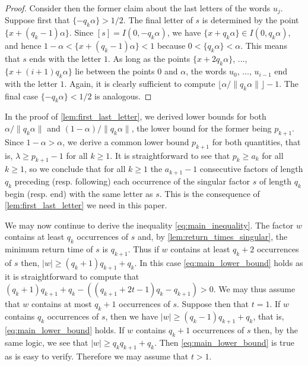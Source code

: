 \documentclass[a4paper,fleqn]{article}
\providecommand{\abs}[1]{\lvert#1\rvert}
\providecommand{\norm}[1]{\lVert#1\rVert}
\providecommand{\floor}[1]{\lfloor#1\rfloor}
\begin{document}
\begin{proof}
    Consider then the former claim about the last letters of the words $u_j$. Suppose first that
    $\{-q_k\alpha\} > 1/2$. The final letter of $s$ is determined by the point $\{x + (q_k - 1)\alpha\}$. Since
    $[s] = I(0, -q_k\alpha)$, we have $\{x + q_k\alpha\} \in I(0, q_k\alpha)$, and hence
    $1 - \alpha < \{x + (q_k - 1)\alpha\} < 1$ because $0 < \{q_k\alpha\} < \alpha$. This means that $s$ ends with the
    letter $1$. As long as the points $\{x + 2q_k\alpha\}$, $\ldots$, $\{x + (i + 1)q_k\alpha\}$ lie between the points
    $0$ and $\alpha$, the words $u_0$, $\ldots$, $u_{i-1}$ end with the letter $1$. Again, it is clearly sufficient to
    compute $\floor{\alpha/\norm{q_k\alpha}} - 1$. The final case $\{-q_k\alpha\} < 1/2$ is analogous.
  \end{proof}

  \begin{remark}\label{rem:weak_consequence}
    In the proof of \autoref{lem:first_last_letter}, we derived lower bounds for both $\alpha/\norm{q_k\alpha}$ and
    $(1 - \alpha)/\norm{q_k\alpha}$, the lower bound for the former being $p_{k+1}$. Since $1 - \alpha > \alpha$, we
    derive a common lower bound $p_{k+1}$ for both quantities, that is, $\lambda \geq p_{k+1} - 1$ for all $k \geq 1$.
    It is straightforward to see that $p_k \geq a_k$ for all $k \geq 1$, so we conclude that for all $k \geq 1$ the
    $a_{k+1} - 1$ consecutive factors of length $q_k$ preceding (resp. following) each occurrence of the singular factor
    $s$ of length $q_k$ begin (resp. end) with the same letter as $s$. This is the consequence of
    \autoref{lem:first_last_letter} we need in this paper.
  \end{remark}

  We may now continue to derive the inequality \eqref{eq:main_inequality}. The factor $w$ contains at least $q_k$
  occurrences of $s$ and, by \autoref{lem:return_times_singular}, the minimum return time of $s$ is $q_{k+1}$. Thus if
  $w$ contains at least $q_k + 2$ occurrences of $s$ then, $\abs{w} \geq (q_k + 1)q_{k+1} + q_k$. In this case
  \eqref{eq:main_lower_bound} holds as it is straightforward to compute that
  $(q_k + 1)q_{k+1} + q_k - ((q_{k+1} + 2t - 1)q_k - q_{k+1}) > 0$. We may thus assume that $w$ contains at most
  $q_k + 1$ occurrences of $s$. Suppose then that $t = 1$. If $w$ contains $q_k$ occurrences of $s$, then we have
  $\abs{w} \geq (q_k - 1)q_{k+1} + q_k$, that is, \eqref{eq:main_lower_bound} holds. If $w$ contains $q_k + 1$
  occurrences of $s$ then, by the same logic, we see that $\abs{w} \geq q_k q_{k+1} + q_k$. Then
  \eqref{eq:main_lower_bound} is true as is easy to verify. Therefore we may assume that $t > 1$.
\end{document}
